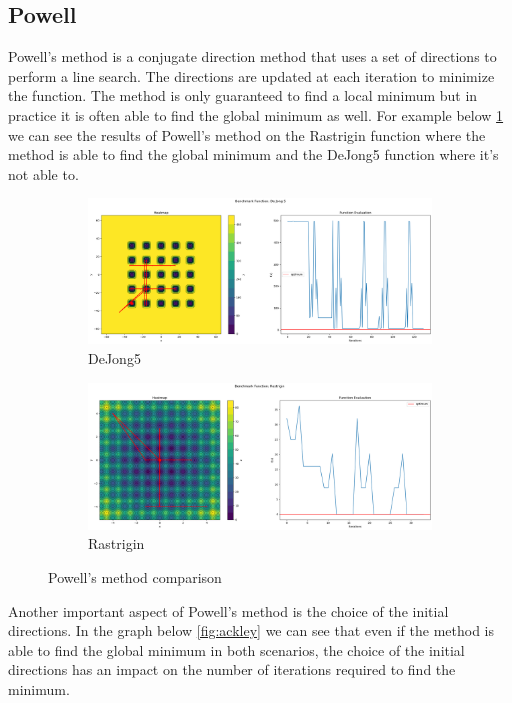 \subsection{Powell}
\label{sec:powell}
Powell's method is a conjugate direction method that uses a set of directions to perform a line search. The directions are updated at each iteration to minimize the function. The method is only guaranteed to find a local minimum but in practice it is often able to find the global minimum as well. For example below \ref{fig:pw} we can see the results of Powell's method on the Rastrigin function where the method is able to find the global minimum and the DeJong5 function where it's not able to.

\begin{figure}[H]
    \begin{subfigure}{0.5\textwidth}
        \includegraphics[width=\textwidth]{lab1/imgs/pw_dejong.png}
        \caption{DeJong5}
    \end{subfigure}
    \begin{subfigure}{0.5\textwidth}
        \includegraphics[width=\textwidth]{lab1/imgs/pw_rastrigin.png}
        \caption{Rastrigin}
    \end{subfigure}
    \caption{Powell's method comparison}
    \label{fig:pw}
\end{figure}

Another important aspect of Powell's method is the choice of the initial directions. In the graph below \ref{fig:ackley} we can see that even if the method is able to find the global minimum in both scenarios, the choice of the initial directions has an impact on the number of iterations required to find the minimum.

